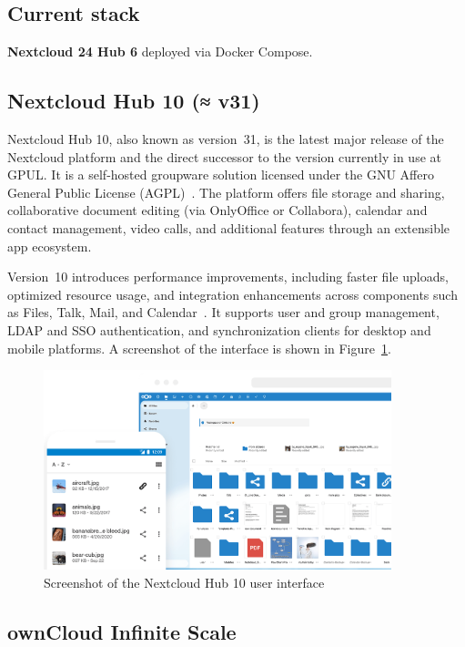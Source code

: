 \subsection*{Current stack}
\textbf{Nextcloud 24 Hub 6} deployed via Docker Compose.

\subsection*{Nextcloud Hub 10 (≈ v31)}

Nextcloud Hub 10, also known as version~31, is the latest major release of the Nextcloud platform and the direct successor to the version currently in use at GPUL. It is a self-hosted groupware solution licensed under the GNU Affero General Public License (AGPL)~\cite{nextcloud-docs}. The platform offers file storage and sharing, collaborative document editing (via OnlyOffice or Collabora), calendar and contact management, video calls, and additional features through an extensible app ecosystem.

Version~10 introduces performance improvements, including faster file uploads, optimized resource usage, and integration enhancements across components such as Files, Talk, Mail, and Calendar~\cite{nextcloud-blog}. It supports user and group management, LDAP and SSO authentication, and synchronization clients for desktop and mobile platforms. A screenshot of the interface is shown in Figure~\ref{fig:nextcloud-ui}.

\begin{figure}[h!]
  \centering
  \includegraphics[width=0.9\textwidth]{imaxes/nextcloud-ui.png}
  \caption{Screenshot of the Nextcloud Hub 10 user interface}
  \label{fig:nextcloud-ui}
\end{figure}

\subsection*{ownCloud Infinite Scale}

